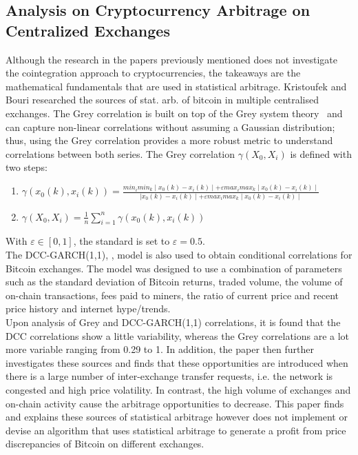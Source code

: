 \subsection{Analysis on Cryptocurrency Arbitrage on Centralized Exchanges}
Although the research in the papers previously mentioned does not investigate the cointegration approach to cryptocurrencies, the takeaways are the mathematical fundamentals that are used in statistical arbitrage. Kristoufek and Bouri researched the sources of stat. arb. of bitcoin in multiple centralised exchanges. The Grey correlation is built on top of the Grey system theory~\cite{JULONG1982288} and can capture non-linear correlations without assuming a Gaussian distribution; thus, using the Grey correlation provides a more robust metric to understand correlations between both series. The Grey correlation $\gamma(X_0, X_i)$ is defined with two steps:
\begin{enumerate}
    \item $\gamma(x_0(k), x_i(k)) = \frac{min_i min_k \mid x_0(k) - x_i(k) \mid + \varepsilon max_i max_k \mid x_0(k) - x_i(k) \mid}{\mid x_0(k) - x_i(k) \mid + \varepsilon max_i max_k \mid x_0(k) - x_i(k) \mid}$
    \item $\gamma(X_0, X_i) = \frac{1}{n} \sum_{i=1}^{n} \gamma(x_0(k), x_i(k))$
\end{enumerate}
\noindent With $\varepsilon \in [0,1]$, the standard is set to $\varepsilon = 0.5$.
\\[3mm]
The DCC-GARCH(1,1), \cite{engle2002dynamic}, model is also used to obtain conditional correlations for Bitcoin exchanges. The model was designed to use a combination of parameters such as the standard deviation of Bitcoin returns, traded volume, the volume of on-chain transactions, fees paid to miners, the ratio of current price and recent price history and internet hype/trends.
\\[3mm]
Upon analysis of Grey and DCC-GARCH(1,1) correlations, it is found that the DCC correlations show a little variability, whereas the Grey correlations are a lot more variable ranging from 0.29 to 1. In addition, the paper then further investigates these sources and finds that these opportunities are introduced when there is a large number of inter-exchange transfer requests, i.e. the network is congested and high price volatility. In contrast, the high volume of exchanges and on-chain activity cause the arbitrage opportunities to decrease. This paper finds and explains these sources of statistical arbitrage however does not implement or devise an algorithm that uses statistical arbitrage to generate a profit from price discrepancies of Bitcoin on different exchanges.
